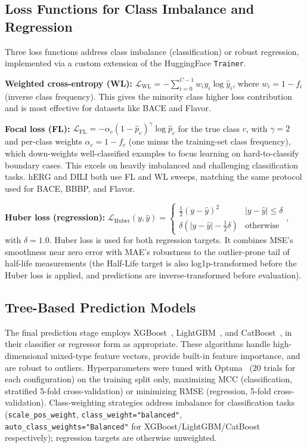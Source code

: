 \documentclass[pdflatex,sn-basic]{sn-jnl}%
\begin{document}
\subsection{Loss Functions for Class Imbalance and Regression}\label{sec:loss_functions}
Three loss functions address class imbalance (classification) or robust regression, implemented via a custom extension of the HuggingFace \texttt{Trainer}.

\noindent \textbf{Weighted cross-entropy (WL):} $\mathcal{L}_{\text{WL}} = -\sum_{i=0}^{C-1} w_i y_i \log\hat{y}_i$, where $w_i = 1 - f_i$ (inverse class frequency). This gives the minority class higher loss contribution and is most effective for datasets like BACE and Flavor.

\noindent\textbf{Focal loss (FL):} $\mathcal{L}_{\text{FL}} = -\alpha_c (1 - \hat{p}_c)^\gamma \log\hat{p}_c$ for the true class $c$, with $\gamma = 2$ and per-class weights $\alpha_c = 1 - f_c$ (one minus the training-set class frequency), which down-weights well-classified examples to focus learning on hard-to-classify boundary cases. This excels on heavily imbalanced and challenging classification tasks. hERG and DILI both use FL and WL sweeps, matching the same protocol used for BACE, BBBP, and Flavor.

\noindent\textbf{Huber loss (regression):} $\mathcal{L}_{\text{Huber}}(y, \hat y) = \begin{cases}\tfrac{1}{2}(y-\hat y)^2 & |y - \hat y| \le \delta \\ \delta(|y-\hat y| - \tfrac12 \delta) & \text{otherwise}\end{cases}$, with $\delta = 1.0$. Huber loss is used for both regression targets. It combines MSE's smoothness near zero error with MAE's robustness to the outlier-prone tail of half-life measurements (the Half-Life target is also log1p-transformed before the Huber loss is applied, and predictions are inverse-transformed before evaluation).

\subsection{Tree-Based Prediction Models}\label{sec:tree_models}
The final prediction stage employs XGBoost~\cite{chen2016xgboost}, LightGBM~\cite{ke2017lightgbm}, and CatBoost~\cite{prokhorenkova2018catboost}, in their classifier or regressor form as appropriate. These algorithms handle high-dimensional mixed-type feature vectors, provide built-in feature importance, and are robust to outliers. Hyperparameters were tuned with Optuna~\cite{akiba2019optuna} ($20$ trials for each configuration) on the training split only, maximizing MCC (classification, stratified 5-fold cross-validation) or minimizing RMSE (regression, 5-fold cross-validation). Class-weighting strategies address imbalance for classification tasks (\texttt{scale\_pos\_weight}, \texttt{class\_weight="balanced"}, \texttt{auto\_class\_weights="Balanced"} for XGBoost/LightGBM/CatBoost respectively); regression targets are otherwise unweighted.
\end{document}
